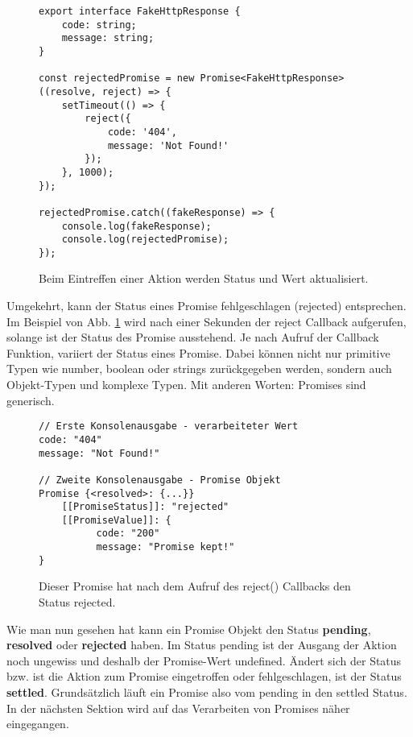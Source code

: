 \begin{figure}[H]
\begin{lstlisting}[basicstyle=\small]
export interface FakeHttpResponse {
    code: string;
    message: string;
}

const rejectedPromise = new Promise<FakeHttpResponse>((resolve, reject) => {
    setTimeout(() => {
        reject({
            code: '404',
            message: 'Not Found!'
        });
    }, 1000);
});

rejectedPromise.catch((fakeResponse) => {
    console.log(fakeResponse);
    console.log(rejectedPromise);
});
\end{lstlisting}
\caption{Beim Eintreffen einer Aktion werden Status und Wert aktualisiert.}
\label{rejected-promise}
\end{figure}

\noindent
Umgekehrt, kann der Status eines Promise fehlgeschlagen (rejected) entsprechen. Im Beispiel von Abb. \ref{rejected-promise} wird nach einer Sekunden der reject Callback aufgerufen, solange ist der Status des Promise ausstehend. Je nach Aufruf der Callback Funktion, variiert der Status eines Promise. Dabei können nicht nur primitive Typen wie number, boolean oder strings zurückgegeben werden, sondern auch Objekt-Typen und komplexe Typen. Mit anderen Worten: Promises sind generisch.

\begin{figure}[H]
\begin{lstlisting}
// Erste Konsolenausgabe - verarbeiteter Wert
code: "404"
message: "Not Found!"
    
// Zweite Konsolenausgabe - Promise Objekt
Promise {<resolved>: {...}}
    [[PromiseStatus]]: "rejected"
    [[PromiseValue]]: {
          code: "200"
          message: "Promise kept!"
}
\end{lstlisting}
\caption{Dieser Promise hat nach dem Aufruf des reject() Callbacks den Status rejected.}
\end{figure}

\noindent
Wie man nun gesehen hat kann ein Promise Objekt den Status \textbf{pending}, \textbf{resolved} oder \textbf{rejected} haben. Im Status pending ist der Ausgang der Aktion noch ungewiss und deshalb der Promise-Wert undefined. Ändert sich der Status bzw. ist die Aktion zum Promise eingetroffen oder fehlgeschlagen, ist der Status \textbf{settled}. Grundsätzlich läuft ein Promise also vom pending in den settled Status. In der nächsten Sektion wird auf das Verarbeiten von Promises näher eingegangen.

